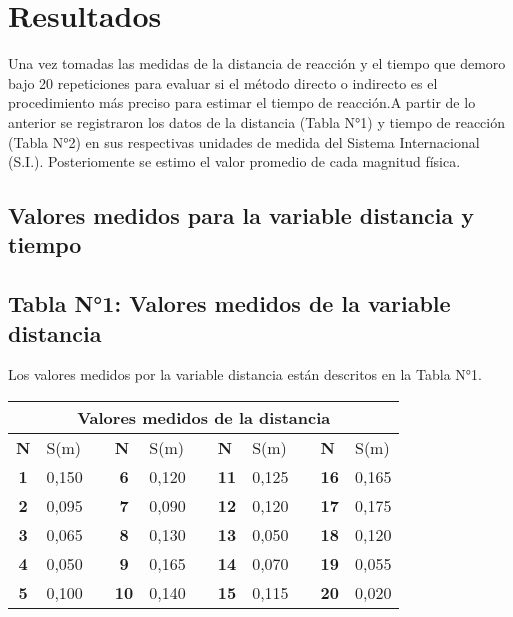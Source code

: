 \documentclass[runningheads]{llncs}
\begin{document}
    \section*{\centering Resultados}
    Una vez tomadas las medidas de la distancia de reacción y el tiempo que demoro bajo 20 repeticiones para evaluar si el método directo o indirecto es el procedimiento más preciso para estimar el tiempo de reacción.A partir de lo anterior se registraron los datos de la distancia (Tabla N°1) y tiempo de reacción (Tabla N°2) en sus respectivas unidades de medida del Sistema Internacional (S.I.). Posteriomente se estimo el valor promedio de cada magnitud física. \\
    \subsection*{Valores medidos para la variable distancia y tiempo} 
    \subsection*{Tabla N°1: Valores medidos de la variable distancia}
    Los valores medidos por la variable distancia están descritos en la Tabla N°1. \\
    \begin{table}[]
        \centering
        \begin{tabular}{crlcrlcrlcr}
        \hline
        \multicolumn{11}{c}{\textbf{Valores medidos de la distancia}} \\ \hline
        \multicolumn{1}{l}{\textbf{N}} & \multicolumn{1}{l}{S(m)} &  & \multicolumn{1}{l}{\textbf{N}} & \multicolumn{1}{l}{S(m)} &  & \multicolumn{1}{l}{\textbf{N}} & \multicolumn{1}{l}{S(m)} &  & \multicolumn{1}{l}{\textbf{N}} & \multicolumn{1}{l}{S(m)} \\ \hline
        \textbf{1} & 0,150 &  & \textbf{6} & 0,120 &  & \textbf{11} & 0,125 &  & \textbf{16} & 0,165 \\
        \textbf{2} & 0,095 &  & \textbf{7} & 0,090 &  & \textbf{12} & 0,120 &  & \textbf{17} & 0,175 \\
        \textbf{3} & 0,065 &  & \textbf{8} & 0,130 &  & \textbf{13} & 0,050 &  & \textbf{18} & 0,120 \\
        \textbf{4} & 0,050 &  & \textbf{9} & 0,165 &  & \textbf{14} & 0,070 &  & \textbf{19} & 0,055 \\
        \textbf{5} & 0,100 &  & \textbf{10} & 0,140 &  & \textbf{15} & 0,115 &  & \textbf{20} & 0,020 \\ \hline
        \end{tabular}
        \end{table}
    
\end{document}
